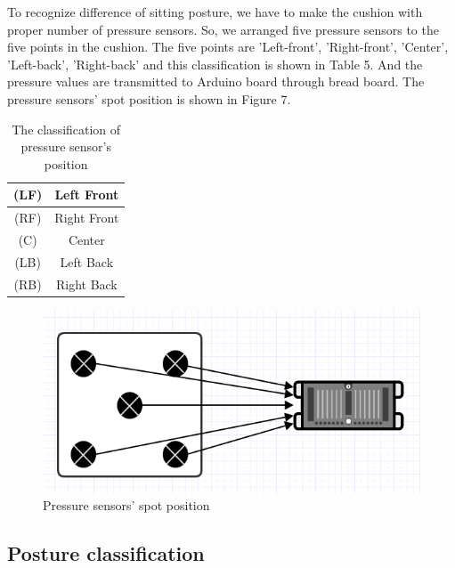 \documentclass[conference]{IEEEtran}
\begin{document}
To recognize difference of sitting posture, we have to make the cushion with proper number of pressure sensors. So, we arranged five pressure sensors to the five points in the cushion. The five points are 'Left-front', 'Right-front', 'Center', 'Left-back', 'Right-back' and this classification is shown in Table 5. And the pressure values are transmitted to Arduino board through bread board. The pressure sensors' spot position is shown in Figure 7.

 \begin{table}[h]
{\renewcommand\arraystretch{1.25}
\caption{The classification of pressure sensor's position}
\begin{tabular}{|c|cc}  \hline\hline
(LF)& \multicolumn{2}{p{7cm}|}{\raggedright Left Front} \\ \hline
(RF)& \multicolumn{2}{p{7cm}|}{\raggedright Right Front} \\ \hline
(C)& \multicolumn{2}{p{7cm}|}{\raggedright Center} \\ \hline
(LB)& \multicolumn{2}{p{7cm}|}{\raggedright Left Back} \\ \hline
(RB)& \multicolumn{2}{p{7cm}|}{\raggedright Right Back} \\ \hline \hline
\end{tabular}}
\end{table}


\begin{figure}[H]
\begin{center}
    \includegraphics[scale=0.5]{img_08.png}
    \caption{Pressure sensors' spot position} 
\end{center}
\end{figure}

\subsection{Posture classification\\}
\end{document}
